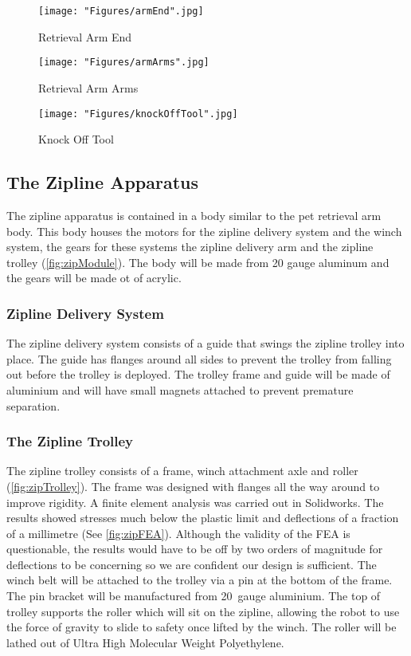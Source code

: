 \documentclass[11pt, oneside]{article} %
\begin{document}
	\begin{figure}[h]
		\centering
		\begin{minipage}[t]{.5\textwidth}
			\centering
			\texttt{[image: "Figures/armEnd".jpg]}
			\caption[Retrieval Arm End]{Retrieval Arm End}
			\label{fig:armEnd}
		\end{minipage}%
		\begin{minipage}[t]{.5\textwidth}
			\centering
			\texttt{[image: "Figures/armArms".jpg]}
			\caption[Retrieval Arm Arms]{Retrieval Arm Arms}
			\label{fig:arm}
		\end{minipage}
	\end{figure}
	
	\begin{figure}[!h]
		\centering
		\texttt{[image: "Figures/knockOffTool".jpg]}
		\caption[Knock Off Tool]{Knock Off Tool}
		\label{fig:knockOffTool}
	\end{figure}
	
	\newpage
	\subsection{The Zipline Apparatus}
	The zipline apparatus is contained in a body similar to the pet retrieval arm body. This body houses the motors for the zipline delivery system and the winch system, the gears for these systems the zipline delivery arm and the zipline trolley (\autoref{fig:zipModule}). The body will be made from 20 gauge aluminum and the gears will be made ot of acrylic.
	
		\subsubsection{Zipline Delivery System}
		The zipline delivery system consists of a guide that swings the zipline trolley into place. The guide has flanges around all sides to prevent the trolley from falling out before the trolley is deployed. The trolley frame and guide will be made of aluminium and will have small magnets attached to prevent premature separation.
		
		\subsubsection{The Zipline Trolley}
		The zipline trolley consists of a frame, winch attachment axle and roller (\autoref{fig:zipTrolley}). The frame was designed with flanges all the way around to improve rigidity. A finite element analysis was carried out in Solidworks. The results showed stresses much below the plastic limit and deflections of a fraction of a millimetre (See \autoref{fig:zipFEA}). Although the validity of the FEA is questionable, the results would have to be off by two orders of magnitude for deflections to be concerning so we are confident our design is sufficient. The winch belt will be attached to the trolley via a pin at the bottom of the frame. The pin bracket will be manufactured from 20~gauge aluminium. The top of trolley supports the roller which will sit on the zipline, allowing the robot to use the force of gravity to slide to safety once lifted by the winch. The roller will be lathed out of Ultra High Molecular Weight Polyethylene.
		
\end{document}
